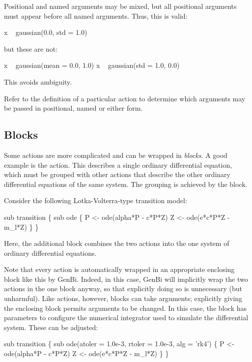 Positional and named arguments may be mixed, but all positional arguments must
appear before all named arguments. Thus, this is valid:
\begin{bicode}
x ~ gaussian(0.0, std = 1.0)
\end{bicode}
but these are not:
\begin{bicode}
x ~ gaussian(mean = 0.0, 1.0)
x ~ gaussian(std = 1.0, 0.0)
\end{bicode}
This avoids ambiguity.

Refer to the definition of a particular action to determine which arguments
may be passed in positional, named or either form.

\subsection{Blocks}

Some actions are more complicated and can be wrapped in \emph{blocks}. A
good example is the  action. This describes a single ordinary
differential equation, which must be
grouped with other actions that describe the other ordinary differential
equations of the same system. The grouping is achieved by the 
block.

Consider the following Lotka-Volterra-type transition
model:
\begin{bicode}
sub transition \{
  sub ode \{
    P <- ode(alpha*P - c*P*Z)
    Z <- ode(e*c*P*Z - m_l*Z)
  \}
\}
\end{bicode}
Here, the additional  block combines the two actions into the
one system of ordinary differential equations.

Note that every action is automatically wrapped in an appropriate enclosing
block like this by GenBi. Indeed, in this case, GenBi will implicitly wrap the
two  actions in the one  block anyway, so that
explicitly doing so is unnecessary (but unharmful). Like actions, however,
blocks can take arguments; explicitly giving the enclosing block permits
arguments to be changed. In this case, the  block has parameters
to configure the numerical integrator used to simulate the differential
system. These can be adjusted:
\begin{bicode}
sub transition \{
  sub ode(atoler = 1.0e-3, rtoler = 1.0e-3, alg = 'rk4') \{
    P <- ode(alpha*P - c*P*Z)
    Z <- ode(e*c*P*Z - m_l*Z)
  \}
\}
\end{bicode}


